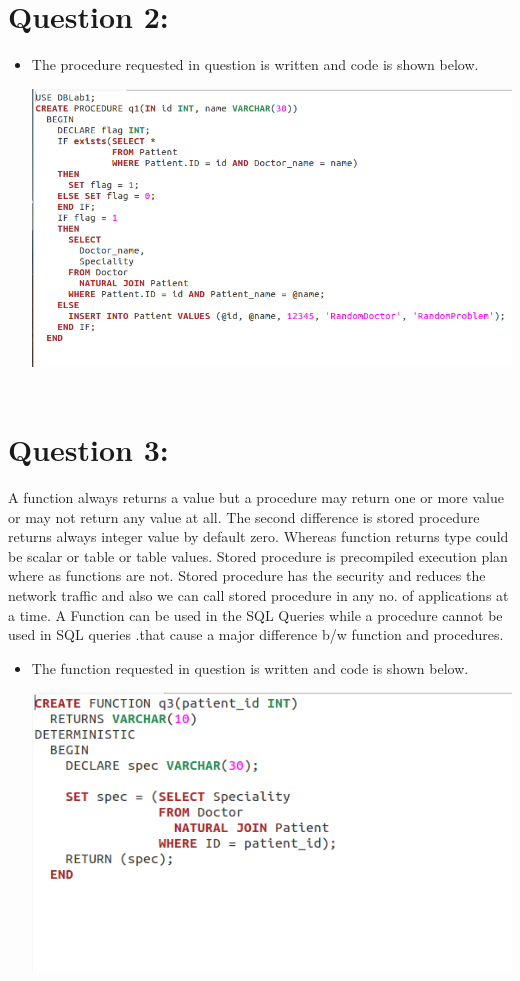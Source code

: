 \documentclass{article}
\begin{document}
\section{Question 2:}
\begin{itemize}
    \item
    The procedure requested in question is written and code is shown below.
    
    	\includegraphics[scale=0.4]{figs/2.png}\
\end{itemize}
\section{Question 3:}
A function always returns a value but a procedure may return one or more value or may not return any value at all. The second difference is stored procedure returns always integer value by default zero. Whereas function returns type could be scalar or table or table values. Stored procedure is precompiled execution plan where as functions are not. Stored procedure has the security and reduces the network traffic and also we can call stored procedure in any no. of applications at a time. A Function can be used in the SQL Queries while a procedure cannot be used in SQL queries .that cause a major difference b/w function and procedures.
\begin{itemize}
    \item
    The function requested in question is written and code is shown below.
    
    	\includegraphics[scale=0.4]{figs/3.png}\
\end{itemize}
\end{document}
